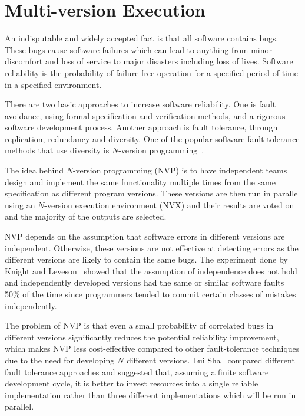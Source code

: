 \chapter{Multi-version Execution}
\label{chap:multi-version}

An indisputable and widely accepted fact is that all software contains bugs.
These bugs cause software failures which can lead to anything from minor
discomfort and loss of service to major disasters including loss of lives.
Software reliability is the probability of failure-free operation for a
specified period of time in a specified environment.

There are two basic approaches to increase software reliability. One is fault
avoidance, using formal specification and verification methods, and a rigorous
software development process. Another approach is fault tolerance, through
replication, redundancy and diversity. One of the popular software fault
tolerance methods that use diversity is $N$-version
programming~\cite{avizienis:nvp}.


The idea behind $N$-version programming (NVP) is to have independent teams
design and implement the same functionality multiple times from the same
specification as different program versions. These versions are then run in
parallel using an $N$-version execution environment (NVX) and their results are
voted on and the majority of the outputs are selected.

NVP depends on the assumption that software errors in different versions are
independent. Otherwise, these versions are not effective at detecting errors as
the different versions are likely to contain the same bugs. The experiment done
by Knight and Leveson~\cite{knight86,knight90} showed that the assumption of
independence does not hold and independently developed versions had the same or
similar software faults 50\% of the time since programmers tended to commit
certain classes of mistakes independently.

The problem of NVP is that even a small probability of correlated bugs in
different versions significantly reduces the potential reliability improvement,
which makes NVP less cost-effective compared to other fault-tolerance
techniques due to the need for developing $N$ different versions. Lui
Sha~\cite{lui01} compared different fault tolerance approaches and suggested
that, assuming a finite software development cycle, it is better to invest
resources into a single reliable implementation rather than three different
implementations which will be run in parallel.

